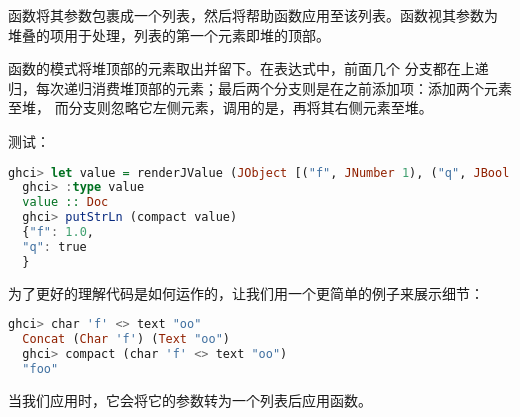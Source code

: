 \documentclass[./main.tex]{subfiles}
\begin{document}
函数将其参数包裹成一个列表，然后将帮助函数应用至该列表。函数视其参数为
堆叠的项用于处理，列表的第一个元素即堆的顶部。

函数的模式将堆顶部的元素取出并留下。在表达式中，前面几个
分支都在上递归，每次递归消费堆顶部的元素；最后两个分支则是在之前添加项：添加两个元素至堆，
而分支则忽略它左侧元素，调用的是，再将其右侧元素至堆。

测试：

\begin{lstlisting}[language=Haskell]
  ghci> let value = renderJValue (JObject [("f", JNumber 1), ("q", JBool True)])
  ghci> :type value
  value :: Doc
  ghci> putStrLn (compact value)
  {"f": 1.0,
  "q": true
  }
\end{lstlisting}

为了更好的理解代码是如何运作的，让我们用一个更简单的例子来展示细节：

\begin{lstlisting}[language=Haskell]
  ghci> char 'f' <> text "oo"
  Concat (Char 'f') (Text "oo")
  ghci> compact (char 'f' <> text "oo")
  "foo"
\end{lstlisting}

当我们应用时，它会将它的参数转为一个列表后应用函数。
\end{document}
